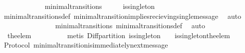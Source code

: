 \begin{isabellebody}
\isamarkupfalse%
\ {\isacharminus}\isanewline
\ \ \isamarkupfalse%
\ {\isasymsigma}\ {\isasymsigma}{\isacharprime}\isanewline
\ \ \isamarkupfalse%
\ {\isachardoublequoteopen}{\isacharparenleft}{\isasymsigma}{\isacharcomma}\ {\isasymsigma}{\isacharprime}{\isacharparenright}\ {\isasymin}\ minimal{\isacharunderscore}transitions{\isachardoublequoteclose}\isanewline
\ \ \isamarkupfalse%
\ \isamarkupfalse%
\ {\isachardoublequoteopen}is{\isacharunderscore}singleton\ {\isacharparenleft}{\isasymsigma}{\isacharprime}{\isacharminus}\ {\isasymsigma}{\isacharparenright}{\isachardoublequoteclose}\isanewline
\ \ \ \ \isamarkupfalse%
\ \ minimal{\isacharunderscore}transitions{\isacharunderscore}def\ minimal{\isacharunderscore}transition{\isacharunderscore}implies{\isacharunderscore}recieving{\isacharunderscore}single{\isacharunderscore}message\ \isamarkupfalse%
\ auto\ \isanewline
\ \ \isamarkupfalse%
\ \isamarkupfalse%
\ {\isachardoublequoteopen}{\isasymsigma}\ {\isasymsubseteq}\ {\isasymsigma}{\isacharprime}{\isachardoublequoteclose}\isanewline
\ \ \ \ \isamarkupfalse%
\ {\isacartoucheopen}{\isacharparenleft}{\isasymsigma}{\isacharcomma}\ {\isasymsigma}{\isacharprime}{\isacharparenright}\ {\isasymin}\ minimal{\isacharunderscore}transitions{\isacartoucheclose}\ minimal{\isacharunderscore}transitions{\isacharunderscore}def\ \isamarkupfalse%
\ auto\isanewline
\ \ \isamarkupfalse%
\ \isamarkupfalse%
\ {\isachardoublequoteopen}{\isasymsigma}\ {\isasymunion}\ {\isacharbraceleft}the{\isacharunderscore}elem\ {\isacharparenleft}{\isasymsigma}{\isacharprime}{\isacharminus}\ {\isasymsigma}{\isacharparenright}{\isacharbraceright}\ {\isacharequal}\ {\isasymsigma}{\isacharprime}{\isachardoublequoteclose}\isanewline
\ \ \ \ \isamarkupfalse%
\ {\isacharparenleft}metis\ Diff{\isacharunderscore}partition\ {\isacartoucheopen}is{\isacharunderscore}singleton\ {\isacharparenleft}{\isasymsigma}{\isacharprime}\ {\isacharminus}\ {\isasymsigma}{\isacharparenright}{\isacartoucheclose}\ is{\isacharunderscore}singleton{\isacharunderscore}the{\isacharunderscore}elem{\isacharparenright}\isanewline
{}\isamarkupfalse%
%
\endisatagproof
{\isafoldproof}%
%
\isadelimproof
\isanewline
%
\endisadelimproof
\isanewline
\isanewline
{}\isamarkupfalse%
\ {\isacharparenleft}\ Protocol{\isacharparenright}\ minimal{\isacharunderscore}transition{\isacharunderscore}is{\isacharunderscore}immediately{\isacharunderscore}next{\isacharunderscore}message\ {\isacharcolon}\isanewline

\end{isabellebody}
